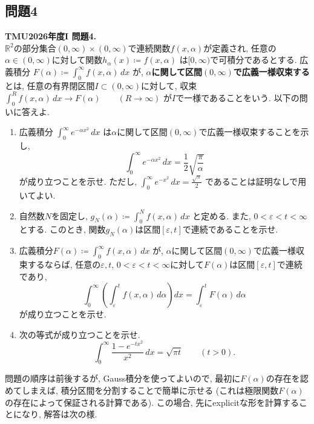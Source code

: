 \documentclass[titlepage]{jsarticle}
\numberwithin{equation}{section}
\begin{document}
\subsection{問題4}
\begin{problem}
\textbf{TMU2026年度I 問題4.}\\
$\mathbb{R}^2$の部分集合$(0,\infty)\times(0,\infty)$で連続関数$f(x,\alpha)$が定義され, 任意の$\alpha\in(0,\infty)$に対して関数$h_\alpha(x)\coloneq f(x,\alpha)$
は$[0,\infty)$で可積分であるとする. 広義積分
$\displaystyle{
F(\alpha)\coloneqq \int_0^\infty f(x,\alpha)\,dx
}$
が, \textbf{$\alpha$に関して区間$(0,\infty)$で広義一様収束する}とは, 任意の有界閉区間$I\subset(0,\infty)$に対して, 収束$\displaystyle{
\int_0^R f(x,\alpha)\,dx\to F(\alpha)
\qquad (R\to\infty)}
$
が$I$で一様であることをいう. 以下の問いに答えよ.

\begin{enumerate}[label=(\arabic*)]
    \item 広義積分
    $\displaystyle{\int_0^\infty e^{-\alpha x^2}\,dx}$
    は$\alpha$に関して区間$(0,\infty)$で広義一様収束することを示し,
    \[
    \int_0^\infty e^{-\alpha x^2}\,dx
    =
    \frac{1}{2}\sqrt{\frac{\pi}{\alpha}}
    \]
    が成り立つことを示せ. ただし, $\displaystyle{\int_0^\infty e^{-x^2}\,dx=\frac{\sqrt{\pi}}{2}}$
    であることは証明なしで用いてよい.

    \item 自然数$N$を固定し, $\displaystyle{g_N(\alpha)\coloneq \int_0^N f(x,\alpha)\,dx}$
    と定める. また, $0<\varepsilon<t<\infty$とする. このとき, 関数$g_N(\alpha)$は区間$[\varepsilon,t]$で連続であることを示せ.

    \item 広義積分$\displaystyle{F(\alpha)\coloneqq \int_0^\infty f(x,\alpha)\,dx}$
    が, $\alpha$に関して区間$(0,\infty)$で広義一様収束するならば, 任意の$\varepsilon,t$, $0<\varepsilon<t<\infty$に対して$F(\alpha)$は区間$[\varepsilon,t]$で連続であり,
    \[
    \int_0^\infty
    \left(
    \int_\varepsilon^t f(x,\alpha)\,d\alpha
    \right)
    dx
    =
    \int_\varepsilon^t F(\alpha)\,d\alpha
    \]
    が成り立つことを示せ.

   \item 次の等式が成り立つことを示せ.
    \[
    \int_0^\infty \frac{1-e^{-tx^2}}{x^2}\,dx
    =
    \sqrt{\pi t}
    \qquad (t>0).
    \]
\end{enumerate}
\end{problem}
\begin{marker}
問題の順序は前後するが, Gauss積分を使ってよいので, 最初に$F(\alpha)$の存在を認めてしまえば, 積分区間を分割することで簡単に示せる (これは極限関数$F(\alpha)$の存在によって保証される計算である). この場合, 先にexplicitな形を計算することになり, 解答は次の様.
\end{marker}
\end{document}
